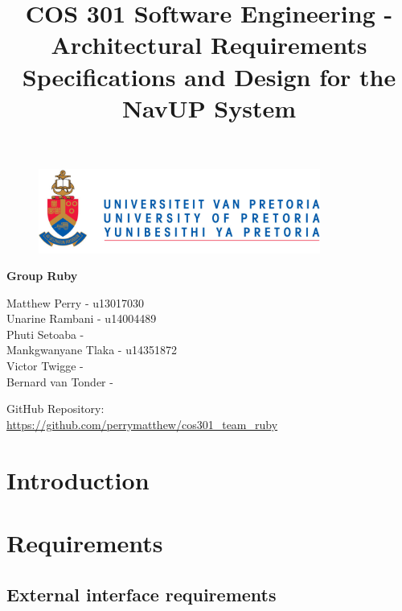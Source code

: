 \documentclass{article}
\begin{document}
		\begin{figure}[t]
			\centering
			\includegraphics[width=350px]{UP_Logo.PNG}
		\end{figure}
			\title{COS 301 Software Engineering -Architectural Requirements Specifications and Design for the NavUP System}
\maketitle
		\begin{center}
			\textbf{\newline Group Ruby} \\
		\end{center}
			
				
		\begin{flushright} \large
			Matthew Perry - u13017030 \\
			Unarine Rambani - u14004489  \\
			Phuti Setoaba -  \\
			Mankgwanyane Tlaka - u14351872  \\
			Victor Twigge -  \\
			Bernard van Tonder -  \\
		\end{flushright}
		
		
		
		
		GitHub Repository: \href{https://github.com/perrymatthew/cos301_team_ruby}\\
		\url{https://github.com/perrymatthew/cos301_team_ruby}
	

\clearpage
\tableofcontents

\clearpage
\section{Introduction}

\clearpage
\section{Requirements}
	\subsection{External interface requirements}
\end{document}

